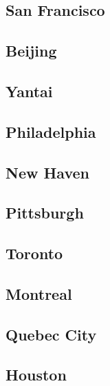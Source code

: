 \documentclass{article}
\begin{document}
    \subsection{San Francisco}
    \begin{outline}
        
    \end{outline}
    \subsection{Beijing}
    \begin{outline}
        
    \end{outline}
    \subsection{Yantai}
    \begin{outline}

    \end{outline}
    \subsection{Philadelphia}
    \begin{outline}

    \end{outline}
    \subsection{New Haven}
    \begin{outline}

    \end{outline}
    \subsection{Pittsburgh}
    \begin{outline}

    \end{outline}
    \subsection{Toronto}
    \begin{outline}

    \end{outline}
    \subsection{Montreal}
    \begin{outline}

    \end{outline}
    \subsection{Quebec City}
    \begin{outline}

    \end{outline}
    \subsection{Houston}
    \begin{outline}

    \end{outline}
\end{document}
